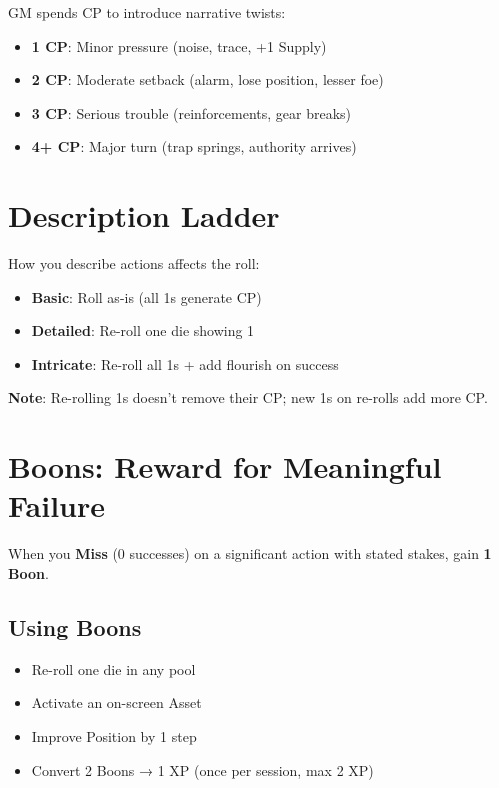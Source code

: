 \documentclass[11pt]{article}
\begin{document}
\begin{fatebox}
GM spends CP to introduce narrative twists:
\begin{itemize}
    \item \textbf{1 CP}: Minor pressure (noise, trace, +1 Supply)
    \item \textbf{2 CP}: Moderate setback (alarm, lose position, lesser foe)
    \item \textbf{3 CP}: Serious trouble (reinforcements, gear breaks)
    \item \textbf{4+ CP}: Major turn (trap springs, authority arrives)
\end{itemize}
\end{fatebox}

\section{Description Ladder}

How you describe actions affects the roll:
\begin{itemize}
    \item \textbf{Basic}: Roll as-is (all 1s generate CP)
    \item \textbf{Detailed}: Re-roll one die showing 1
    \item \textbf{Intricate}: Re-roll all 1s + add flourish on success
\end{itemize}

\textbf{Note}: Re-rolling 1s doesn't remove their CP; new 1s on re-rolls add more CP.

\section{Boons: Reward for Meaningful Failure}

When you \textbf{Miss} (0 successes) on a significant action with stated stakes, gain \textbf{1 Boon}.

\subsection{Using Boons}
\begin{itemize}
    \item Re-roll one die in any pool
    \item Activate an on-screen Asset
    \item Improve Position by 1 step
    \item Convert 2 Boons → 1 XP (once per session, max 2 XP)
\end{itemize}
\end{document}
